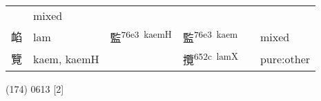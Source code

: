 \documentclass[14pt,a4paper]{scrartcl}
\begin{document}
\begin{longtable}[c]{@{}llllll@{}}
\begin{minipage}[t]{0.14\columnwidth}
\strut\end{minipage} &
\begin{minipage}[t]{0.14\columnwidth}\raggedright\strut
mixed
\strut\end{minipage}\tabularnewline
\begin{minipage}[t]{0.14\columnwidth}\raggedright\strut
䘓
\strut\end{minipage} &
\begin{minipage}[t]{0.14\columnwidth}\raggedright\strut
lam
\strut\end{minipage} &
\begin{minipage}[t]{0.14\columnwidth}\raggedright\strut
監\textsuperscript{76e3~kaemH}
\strut\end{minipage} &
\begin{minipage}[t]{0.14\columnwidth}\raggedright\strut
監\textsuperscript{76e3~kaem}
\strut\end{minipage} &
\begin{minipage}[t]{0.14\columnwidth}\raggedright\strut
\strut\end{minipage} &
\begin{minipage}[t]{0.14\columnwidth}\raggedright\strut
mixed
\strut\end{minipage}\tabularnewline
\begin{minipage}[t]{0.14\columnwidth}\raggedright\strut
覽
\strut\end{minipage} &
\begin{minipage}[t]{0.14\columnwidth}\raggedright\strut
kaem, kaemH
\strut\end{minipage} &
\begin{minipage}[t]{0.14\columnwidth}\raggedright\strut
\strut\end{minipage} &
\begin{minipage}[t]{0.14\columnwidth}\raggedright\strut
攬\textsuperscript{652c~lamX}
\strut\end{minipage} &
\begin{minipage}[t]{0.14\columnwidth}\raggedright\strut
\strut\end{minipage} &
\begin{minipage}[t]{0.14\columnwidth}\raggedright\strut
pure:other
\strut\end{minipage}\tabularnewline
\bottomrule
\end{longtable}

(174) 0613 {[}2{]}
\end{document}

